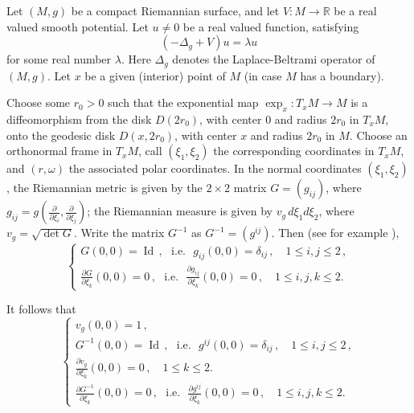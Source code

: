 \documentclass[12pt,a4paper]{amsart}
\theoremstyle{plain} %
\theoremstyle{definition}
\numberwithin{equation}{section}
\numberwithin{figure}{section}
\numberwithin{table}{section}
\newcommand{\R}{\mathbb{R}}
\DeclareMathOperator{\id}{Id}
\begin{document}
Let $(M,g)$ be a compact Riemannian surface, and let $V : M \to \R$ be a real valued smooth potential. Let $u \not = 0$ be a real valued function, satisfying
%
\begin{equation}\label{E-lsns-1}
(-\Delta_g + V)u = \lambda u
\end{equation}
%
for some real number $\lambda$. Here $\Delta_g$ denotes the Laplace-Beltrami operator of $(M,g)$. Let $x$ be a given (interior) point of $M$ (in case $M$ has a boundary).\medskip

Choose some $r_0 > 0$ such that the exponential map $\exp_x : T_xM \to M$ is a diffeomorphism from the disk $D(2r_0)$, with center $0$ and  radius $2r_0$ in $T_xM$, onto the geodesic disk $D(x,2r_0)$, with center $x$ and radius $2r_0$ in $M$. Choose an orthonormal frame in $T_xM$, call $(\xi_1,\xi_2)$ the corresponding coordinates in $T_xM$, and $(r,\omega)$ the associated polar coordinates. In the normal coordinates $(\xi_1,\xi_2)$, the Riemannian metric is given by the $2\times2$ matrix $G = (g_{ij})$, where $g_{ij} = g(\frac{\partial}{\partial \xi_i},\frac{\partial}{\partial \xi_j})$; the Riemannian measure is given by $v_g\, d\xi_1 d\xi_2$, where $v_g = \sqrt{\det G}$. Write the matrix $G^{-1}$ as $G^{-1} = (g^{ij})$. Then (see for example \cite[\S~2.89bis, p. 87]{GaHuLa2004}),
%
\begin{equation}\label{E-lsns-2a}
\left\{
\begin{array}{l}
G(0,0) = \id\,, \text{~~i.e.~~} g_{ij}(0,0) = \delta_{ij}\,,
\quad 1 \le i,j \le 2\,, \\[5pt]
\frac{\partial G}{\partial \xi_k}(0,0) = 0\,, \text{~~i.e.~~} \frac{\partial g_{ij}}{\partial \xi_k}(0,0) = 0\,, \quad 1 \le i,j,k \le 2.
\end{array}%
\right.
\end{equation}

It follows that
%
\begin{equation}\label{E-lsns-2b}
\left\{
\begin{array}{l}
v_g(0,0) = 1\,,\\[5pt]
G^{-1}(0,0) = \id\,, \text{~~i.e.~~} g^{ij}(0,0) = \delta_{ij}\,,
\quad 1 \le i,j \le 2\,, \\[5pt]
\frac{\partial v_g}{\partial \xi_k}(0,0) = 0\,, \quad 1 \le k \le 2. \\[5pt]
\frac{\partial G^{-1}}{\partial \xi_k}(0,0) = 0\,, \text{~~i.e.~~} \frac{\partial g^{ij}}{\partial \xi_k}(0,0) = 0\,, \quad 1 \le i,j,k \le 2.
\end{array}%
\right.
\end{equation}
\end{document}
